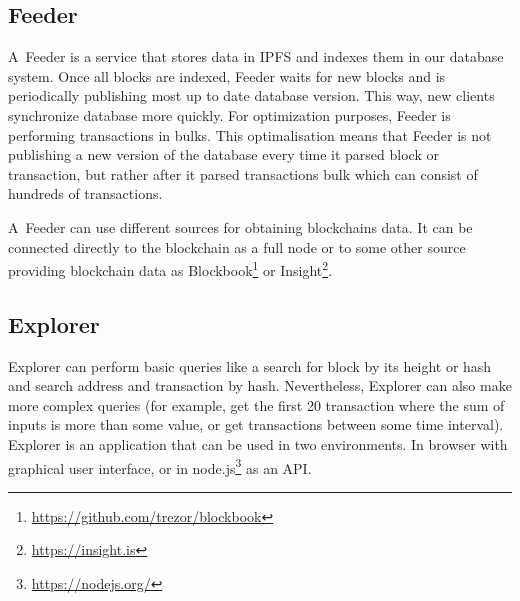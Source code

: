 \subsection{Feeder}
A~Feeder is a service that stores data in IPFS and indexes them in our database system. Once all blocks are indexed, Feeder waits for new blocks and is periodically publishing most up to date database version. This way, new clients synchronize database more quickly. For optimization purposes, Feeder is performing transactions in bulks. This optimalisation means that Feeder is not publishing a new version of the database every time it parsed block or transaction, but rather after it parsed transactions bulk which can consist of hundreds of transactions.  

A~Feeder can use different sources for obtaining blockchains data. It can be connected directly to the blockchain as a full node or to some other source providing blockchain data as Blockbook\footnote{\url{https://github.com/trezor/blockbook}} or Insight\footnote{\url{https://insight.is}}.


\subsection{Explorer}
Explorer can perform basic queries like a search for block by its height or hash and search address and transaction by hash. Nevertheless, Explorer can also make more complex queries (for example, get the first 20 transaction where the sum of inputs is more than some value, or get transactions between some time interval). Explorer is an application that can be used in two environments. In browser with graphical user interface, or in node.js\footnote{\url{https://nodejs.org/}} as an API.

